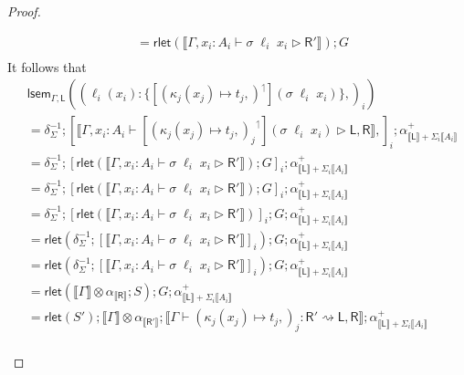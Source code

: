 \documentclass[acmsmall,screen,review]{acmart}
\newcommand{\ms}[1]{\ensuremath{\mathsf{#1}}}
\newcommand{\lto}{:}
\newcommand{\wbranch}[3]{#1(#2) \lto \{#3\}}
\newcommand{\lupg}[1]{{#1}^\upharpoonleft}
\newcommand{\bhyp}[2]{#1 : #2}
\newcommand{\haslb}[3]{#1 \vdash #2 \rhd #3}
\newcommand{\lbsubst}[4]{#1 \vdash #2: #3 \rightsquigarrow #4}
\newcommand{\dnt}[1]{\llbracket{#1}\rrbracket}
\newcommand{\loopmor}[3]{\ms{lsem}_{#1, #3}(#2)}
\newcommand{\rlmor}[1]{\ms{rlet}(#1)}
\begin{document}
\begin{proof}
\begin{itemize}[leftmargin=*]
\begin{equation}
\begin{aligned}
        & = \rlmor{
          \dnt{\haslb{\Gamma, \bhyp{x_i}{A_i}}{\sigma\;\ell_i\;x_i}{\ms{R}'}}
        } ; G \\
      \end{aligned}
    \end{equation}
    It follows that
    \begin{equation}
      \begin{aligned}
        & \loopmor{\Gamma}
          {(\wbranch{\ell_i}{x_i}{[\lupg{(\kappa_j(x_j) \mapsto t_j,)}](\sigma\;\ell_i\;x_i)},)_i}
          {\ms{L}}
        \\
        & = \delta^{-1}_\Sigma 
          ; [ \dnt{\haslb{\Gamma, \bhyp{x_i}{A_i}}
                  {[\lupg{(\kappa_j(x_j) \mapsto t_j,)_j}](\sigma\;\ell_i\;x_i)}{\ms{L}, \ms{R}}}, ]_i
          ; \alpha^+_{\dnt{\ms{L}} + \Sigma_i \dnt{A_i}}   \\
        & = \delta^{-1}_\Sigma 
          ; [ \rlmor{
                \dnt{\haslb{\Gamma, \bhyp{x_i}{A_i}}{\sigma\;\ell_i\;x_i}{\ms{R}'}}
              } ; G ]_i
          ; \alpha^+_{\dnt{\ms{L}} + \Sigma_i \dnt{A_i}}   \\
        & = \delta^{-1}_\Sigma 
          ; [ \rlmor{
                \dnt{\haslb{\Gamma, \bhyp{x_i}{A_i}}{\sigma\;\ell_i\;x_i}{\ms{R}'}}
              } ; G ]_i
          ; \alpha^+_{\dnt{\ms{L}} + \Sigma_i \dnt{A_i}}   \\
        & = \delta^{-1}_\Sigma 
          ; [\rlmor{
                \dnt{\haslb{\Gamma, \bhyp{x_i}{A_i}}{\sigma\;\ell_i\;x_i}{\ms{R}'}}
              }]_i ; G ; \alpha^+_{\dnt{\ms{L}} + \Sigma_i \dnt{A_i}}  \\
        & = \rlmor{\delta^{-1}_\Sigma 
          ; [
                \dnt{\haslb{\Gamma, \bhyp{x_i}{A_i}}{\sigma\;\ell_i\;x_i}{\ms{R}'}}
            ]_i} ; G ; \alpha^+_{\dnt{\ms{L}} + \Sigma_i \dnt{A_i}}   \\
        & = \rlmor{\delta^{-1}_\Sigma 
          ; [
                \dnt{\haslb{\Gamma, \bhyp{x_i}{A_i}}{\sigma\;\ell_i\;x_i}{\ms{R}'}}
            ]_i} ; G ; \alpha^+_{\dnt{\ms{L}} + \Sigma_i \dnt{A_i}}   \\
        & = \rlmor{\dnt{\Gamma} \otimes \alpha_{\dnt{\ms{R}}} ; S} ; G 
          ; \alpha^+_{\dnt{\ms{L}} + \Sigma_i \dnt{A_i}} \\
        & = \rlmor{S'} ; \dnt{\Gamma} \otimes \alpha_{\dnt{\ms{R'}}} 
          ; \dnt{\lbsubst{\Gamma}{(\kappa_j(x_j) \mapsto t_j,)_j}{\ms{R}'}{\ms{L}, \ms{R}}}
          ; \alpha^+_{\dnt{\ms{L}} + \Sigma_i \dnt{A_i}} \\

\end{aligned}
\end{equation}
\end{itemize}
\end{proof}
\end{document}
